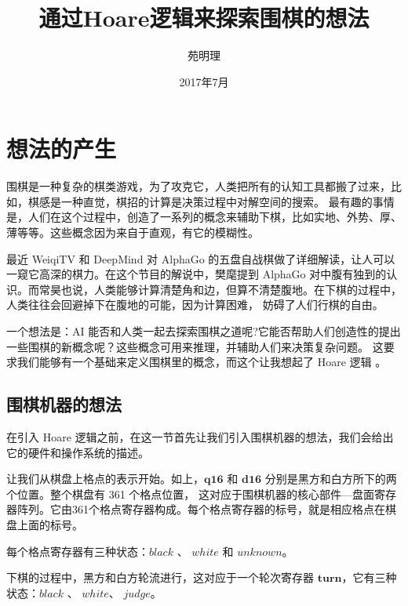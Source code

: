 \documentclass[a4paper,10.5pt]{article}
\title{通过Hoare逻辑来探索围棋的想法}
\author{苑明理}
\date{2017年7月}
\begin{document}
\maketitle{}
\renewcommand\contentsname{目录}
\setcounter{tocdepth}{2}
\tableofcontents

\section{想法的产生}

围棋是一种复杂的棋类游戏，为了攻克它，人类把所有的认知工具都搬了过来，比如，棋感是一种直觉，棋招的计算是决策过程中对解空间的搜索。
最有趣的事情是，人们在这个过程中，创造了一系列的概念来辅助下棋，比如实地、外势、厚、薄等等。这些概念因为来自于直观，有它的模糊性。

最近 WeiqiTV 和 DeepMind 对 AlphaGo 的五盘自战棋做了详细解读，让人可以一窥它高深的棋力。在这个节目的解说中，樊麾提到 AlphaGo
对中腹有独到的认识。而常昊也说，人类能够计算清楚角和边，但算不清楚腹地。在下棋的过程中，人类往往会回避掉下在腹地的可能，因为计算困难，
妨碍了人们行棋的自由。

一个想法是：AI 能否和人类一起去探索围棋之道呢?它能否帮助人们创造性的提出一些围棋的新概念呢？这些概念可用来推理，并辅助人们来决策复杂问题。
这要求我们能够有一个基础来定义围棋里的概念，而这个让我想起了 Hoare 逻辑 。

\subsection{围棋机器的想法}

在引入 Hoare 逻辑之前，在这一节首先让我们引入围棋机器的想法，我们会给出它的硬件和操作系统的描述。

\setcounter{gomove}{-1}
\begin{center}
\begin{psgoboard}
\end{psgoboard}
\end{center}

让我们从棋盘上格点的表示开始。如上，$\mathbf{q16}$ 和 $\mathbf{d16}$ 分别是黑方和白方所下的两个位置。整个棋盘有 361 个格点位置，
这对应于围棋机器的核心部件—盘面寄存器阵列。它由361个格点寄存器构成。每个格点寄存器的标号，就是相应格点在棋盘上面的标号。

每个格点寄存器有三种状态：$\mathit{black}$ 、 $\mathit{white}$ 和 $\mathit{unknown}$。

下棋的过程中，黑方和白方轮流进行，这对应于一个轮次寄存器 $\mathbf{turn}$，它有三种状态：$\mathit{black}$ 、 $\mathit{white}$、 $\mathit{judge}$。
\end{document}
